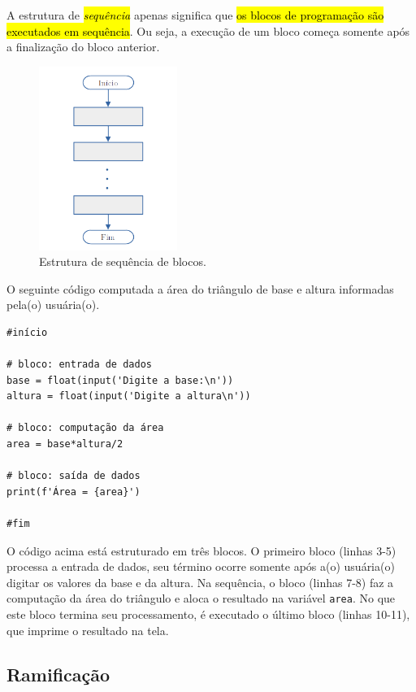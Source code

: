 A estrutura de \hl{\emph{sequência}} apenas significa que \hl{os blocos de programação são executados em sequência}. Ou seja, a execução de um bloco começa somente após a finalização do bloco anterior.

\begin{figure}[H]
  \centering
  \includegraphics[width=0.4\textwidth]{./cap_progest/dados/fig_fg_sequencia/fig}
  \caption{Estrutura de sequência de blocos.}
  \label{cap_progest:fig:fg_sequencia}
\end{figure}

\begin{ex}
  O seguinte código computada a área do triângulo de base e altura informadas pela(o) usuária(o).

\begin{lstlisting}
#início

# bloco: entrada de dados
base = float(input('Digite a base:\n'))
altura = float(input('Digite a altura\n'))

# bloco: computação da área
area = base*altura/2

# bloco: saída de dados
print(f'Área = {area}')

#fim
\end{lstlisting}

O código acima está estruturado em três blocos. O primeiro bloco (linhas 3-5) processa a entrada de dados, seu término ocorre somente após a(o) usuária(o) digitar os valores da base e da altura. Na sequência, o bloco (linhas 7-8) faz a computação da área do triângulo e aloca o resultado na variável \lstinline+area+. No que este bloco termina seu processamento, é executado o último bloco (linhas 10-11), que imprime o resultado na tela.
\end{ex}

\subsection{Ramificação}

